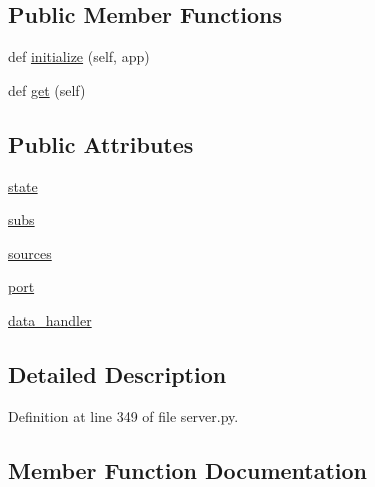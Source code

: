 \subsection*{Public Member Functions}
\begin{DoxyCompactItemize}
\item 
def \hyperlink{classparlai_1_1mturk_1_1webapp_1_1server_1_1WorkerListHandler_ad375655741a045539a790aa1eb8878df}{initialize} (self, app)
\item 
def \hyperlink{classparlai_1_1mturk_1_1webapp_1_1server_1_1WorkerListHandler_a3383de3fd04a665c4a8515f5b24298e0}{get} (self)
\end{DoxyCompactItemize}
\subsection*{Public Attributes}
\begin{DoxyCompactItemize}
\item 
\hyperlink{classparlai_1_1mturk_1_1webapp_1_1server_1_1WorkerListHandler_a148a2a0c1abac1c1e910053612a68100}{state}
\item 
\hyperlink{classparlai_1_1mturk_1_1webapp_1_1server_1_1WorkerListHandler_a45a7642674a9e26e63898339dd8f77eb}{subs}
\item 
\hyperlink{classparlai_1_1mturk_1_1webapp_1_1server_1_1WorkerListHandler_ad75402572f58d507dacf6db95960239e}{sources}
\item 
\hyperlink{classparlai_1_1mturk_1_1webapp_1_1server_1_1WorkerListHandler_a92bb448ef812ff9ff294d703078c5cb0}{port}
\item 
\hyperlink{classparlai_1_1mturk_1_1webapp_1_1server_1_1WorkerListHandler_ac2d150c97af3040146f49dc7d9f178c1}{data\+\_\+handler}
\end{DoxyCompactItemize}


\subsection{Detailed Description}


Definition at line 349 of file server.\+py.



\subsection{Member Function Documentation}
\mbox{\label{classparlai_1_1mturk_1_1webapp_1_1server_1_1WorkerListHandler_a3383de3fd04a665c4a8515f5b24298e0}} 
